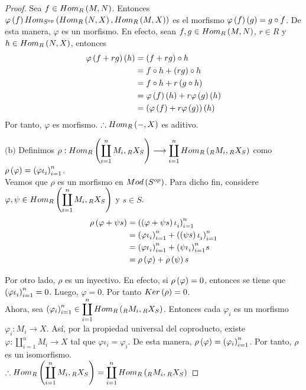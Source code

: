\documentclass{article}
\begin{document}
\begin{enumerate}[label=\textbf{Ej \arabic*.}]
\begin{proof}
			Sea $f\in Hom_{R}\left(M,N\right)$. Entonces $\varphi\left(f\right)Hom_{{S}^{op}}\left(Hom_{R}\left(N,X\right),Hom_{R}\left(M,X\right)\right)$ es el morfismo $\varphi\left(f\right)\left(g\right)=g \circ f$. De esta manera, $\varphi$ es un morfismo. En efecto, sean $f,g\in Hom_{R}\left(M,N\right)$, $r \in R$ y $h\in Hom_{R}\left(N,X\right)$, entonces
			\begin{align*}
				\varphi\left(f+rg\right)\left(h\right) &= \left(f+rg\right) \circ h\\
				&=f \circ h + \left(rg\right) \circ h\\
				&=f \circ h + r\left(g \circ h\right)\\
				&=\varphi\left(f\right)\left(h\right)+r\varphi\left(g\right)\left(h\right)\\
				&=\left(\varphi\left(f\right)+r\varphi\left(g\right)\right)\left(h\right)
			\end{align*}
			Por tanto, $\varphi$ es morfismo. $\therefore Hom_{R}\left(-,X\right)$ es aditivo.
			
			$\boxed{\text{(b)}}$ Definimos $\rho : \ringmodhom{R}{\displaystyle\coprod_{i=1}^{n}M_{i}}{\ringbimod{R}{S}{X}{lr}} \longrightarrow \displaystyle\coprod_{i=1}^{n}\ringmodhom{R}{\ringmod{R}{M_{i}}{l}}{\ringbimod{R}{S}{X}{lr}}$ como $\rho\left(\varphi\right)={\left({\varphi\iota}_{i}\right)}_{i=1}^{n}$.\\
			
			Veamos que $\rho$ es un morfismo en $Mod\left({S}^{op}\right)$. Para dicho fin, considere $\varphi , \psi \in \ringmodhom{R}{\displaystyle\coprod_{i=1}^{n}M_{i}}{\ringbimod{R}{S}{X}{lr}}$ y $s \in S$.
			\begin{align*}
				\rho\left(\varphi + \psi s\right) &= {\left({\left(\varphi + \psi s\right)\iota}_{i}\right)}_{i=1}^{n}\\
				&= {\left({\varphi\iota}_{i}\right)}_{i=1}^{n} + {\left({\left(\psi s\right)\iota}_{i}\right)}_{i=1}^{n}\\
				&= {\left({\varphi\iota}_{i}\right)}_{i=1}^{n} + {\left({\psi\iota}_{i}\right)}_{i=1}^{n} s\\
				&= \rho\left(\varphi\right) + \rho\left(\psi\right) s
			\end{align*}
			
			Por otro lado, $\rho$ es un inyectivo. En efecto, si $\rho\left(\varphi\right)=0$, entonces se tiene que ${\left({\varphi\iota}_{i}\right)}_{i=1}^{n}=0$. Luego, $\varphi=0$. Por tanto $Ker\left(\rho\right)=0$.\\
			
			Ahora, sea $\fntuple{\varphi}{i}{n} \in \displaystyle\coprod_{i=1}^{n}\ringmodhom{R}{\ringmod{R}{M_{i}}{l}}{\ringbimod{R}{S}{X}{lr}}$. Entonces cada $\varphi_{i}$ es un morfismo $\varphi_{i}:M_{i} \longrightarrow X$. Así, por la propiedad universal del coproducto, existe $\varphi:\displaystyle\coprod_{i=1}^{n}M_{i} \longrightarrow X$ tal que $\varphi\iota_{i}=\varphi_{i}$. De esta manera, $\rho\left(\varphi\right)={\left({\varphi}_{i}\right)}_{i=1}^{n}$. Por tanto, $\rho$ es un isomorfismo.\\
			$\therefore\ringmodhom{R}{\displaystyle\coprod_{i=1}^{n}M_{i}}{\ringbimod{R}{S}{X}{lr}}=\displaystyle\coprod_{i=1}^{n}\ringmodhom{R}{\ringmod{R}{M_{i}}{l}}{\ringbimod{R}{S}{X}{lr}}$
		\end{proof}
		

\end{enumerate}
\end{document}
